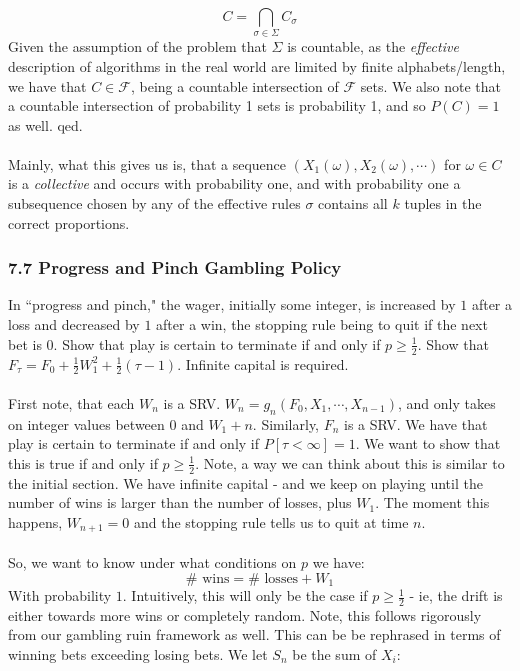 \documentclass[12pt,a4paper]{article}
\newcommand{\1}[1]{\mathbbm{1}\left\{ #1 \right\}}
\newcommand{\fcal}{\mathcal{F}}
\begin{document}
$$
	C = \bigcap_{\sigma \in \Sigma} C_\sigma
$$
Given the assumption of the problem that $\Sigma$ is countable, as the \textit{effective} description of algorithms in the real world are limited by finite alphabets/length, we have that $C \in \fcal$, being a countable intersection of $\fcal$ sets. We also note that a countable intersection of probability 1 sets is probability 1, and so $P(C) = 1$ as well. qed.
\\\\
Mainly, what this gives us is, that a sequence $(X_1(\omega), X_2(\omega), \cdots)$ for $\omega \in C$ is a \textit{collective} and occurs with probability one, and with probability one a subsequence chosen by any of the effective rules $\sigma$ contains all $k$ tuples in the correct proportions.

\subsubsection{7.7 Progress and Pinch Gambling Policy} In ``progress and pinch," the wager, initially some integer, is increased by $1$ after a loss and decreased by $1$ after a win, the stopping rule being to quit if the next bet is $0$. Show that play is certain to terminate if and only if $p \geq \frac{1}{2}$. Show that $F_\tau = F_0 + \frac{1}{2}W_1^2 + \frac{1}{2}(\tau - 1)$. Infinite capital is required.
\\\\
First note, that each $W_n$ is a SRV. $W_n = g_n(F_0, X_1, \cdots, X_{n-1})$, and only takes on integer values between $0$ and $W_1 + n$. Similarly, $F_n$ is a SRV. We have that play is certain to terminate if and only if $P[\tau < \infty] = 1$. We want to show that this is true if and only if $p \geq \frac{1}{2}$. Note, a way we can think about this is similar to the initial section. We have infinite capital - and we keep on playing until the number of wins is larger than the number of losses, plus $W_1$. The moment this happens, $W_{n + 1} = 0$ and the stopping rule tells us to quit at time $n$.
\\\\
So, we want to know under what conditions on $p$ we have:
$$
	\text{$\#$ wins} = \text{$\#$ losses} + W_1
$$
With probability $1$. Intuitively, this will only be the case if $p \geq \frac{1}{2}$ - ie, the drift is either towards more wins or completely random. Note, this follows rigorously from our gambling ruin framework as well. This can be be rephrased in terms of winning bets exceeding losing bets. We let $S_n$ be the sum of $X_i$:
\end{document}
